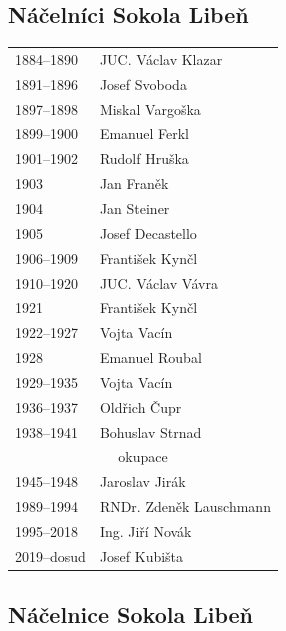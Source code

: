 \documentclass[a5paper, 11pt, twoside]{article}
\begin{document}
\clearpage
\raggedcolumns
\begin{multicols}{2}
\subsection{Náčelníci Sokola Libeň}

\begin{tabular}[]{l >{\raggedright\arraybackslash}p{3cm}}
1884--1890 &  JUC. Václav Klazar \\
1891--1896 &  Josef Svoboda \\
1897--1898 &  Miskal Vargoška \\
1899--1900 &  Emanuel Ferkl \\
1901--1902 &  Rudolf Hruška \\
1903 & Jan Franěk \\
1904 & Jan Steiner \\
1905 & Josef Decastello \\
1906--1909 &  František Kynčl \\
1910--1920 &  JUC. Václav Vávra \\
1921 & František Kynčl \\
1922--1927 &  Vojta Vacín \\
1928 & Emanuel Roubal \\
1929--1935 &  Vojta Vacín \\
1936--1937 &  Oldřich Čupr \\
1938--1941 &  Bohuslav Strnad \\[6pt]
\multicolumn{2}{c}{okupace} \\[6pt]
1945--1948 &  Jaroslav Jirák \\
1989--1994 &  RNDr. Zdeněk Lauschmann \\
1995--2018 &  Ing. Jiří Novák \\
2019--dosud &  Josef Kubišta \\
\end{tabular}

\subsection{Náčelnice Sokola Libeň}


\end{multicols}
\end{document}
